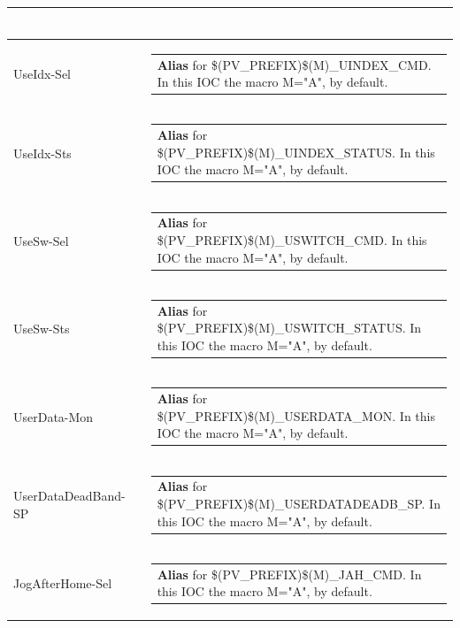 \documentclass[openany]{article}
\begin{document}
\begin{longtable}{| m{4.5cm} m{2.5cm}  m{8.5cm} |}
\begin{tabular}{@{}m{6cm}@{}}
            \end{tabular} \hypertarget{pv:use-idx}{}\\ \hline
        UseIdx-Sel &  & \begin{tabular}{@{}m{6cm}@{}}
                \textbf{\color{blue} Alias} for \$(PV\_PREFIX)\$(M)\_UINDEX\_CMD. In this IOC the macro M="A", by default.
            \end{tabular} \hypertarget{}{}\\ \hline
        UseIdx-Sts &  & \begin{tabular}{@{}m{6cm}@{}}
                \textbf{\color{blue} Alias} for \$(PV\_PREFIX)\$(M)\_UINDEX\_STATUS. In this IOC the macro M="A", by default.
            \end{tabular} \hypertarget{pv:use-sw}{}\\ \hline
        UseSw-Sel &  & \begin{tabular}{@{}m{6cm}@{}}
                \textbf{\color{blue} Alias} for \$(PV\_PREFIX)\$(M)\_USWITCH\_CMD. In this IOC the macro M="A", by default.
            \end{tabular} \hypertarget{}{}\\ \hline
        UseSw-Sts &  & \begin{tabular}{@{}m{6cm}@{}}
                \textbf{\color{blue} Alias} for \$(PV\_PREFIX)\$(M)\_USWITCH\_STATUS. In this IOC the macro M="A", by default.
            \end{tabular} \hypertarget{pv:user-data-mon}{}\\ \hline
        UserData-Mon &  & \begin{tabular}{@{}m{6cm}@{}}
                \textbf{\color{blue} Alias} for \$(PV\_PREFIX)\$(M)\_USERDATA\_MON. In this IOC the macro M="A", by default.
            \end{tabular} \hypertarget{pv:user-data-deadband}{}\\ \hline
        UserDataDeadBand-SP &  & \begin{tabular}{@{}m{6cm}@{}}
                \textbf{\color{blue} Alias} for \$(PV\_PREFIX)\$(M)\_USERDATADEADB\_SP. In this IOC the macro M="A", by default.
            \end{tabular} \hypertarget{pv:jog-after-home-sel}{}\\ \hline
        JogAfterHome-Sel &  & \begin{tabular}{@{}m{6cm}@{}}
                \textbf{\color{blue} Alias} for \$(PV\_PREFIX)\$(M)\_JAH\_CMD. In this IOC the macro M="A", by default.

\end{tabular}
\end{longtable}
\end{document}

